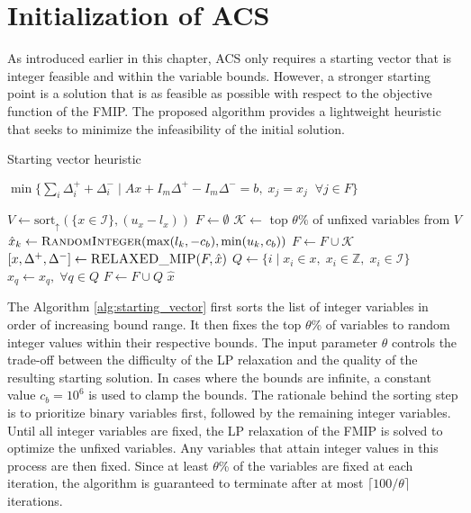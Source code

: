 \section{Initialization of ACS}
As introduced earlier in this chapter, ACS only requires a starting vector that is integer feasible and within the variable bounds. However, a stronger starting point is a solution that is as feasible as possible with respect to the objective function of the FMIP.
The proposed algorithm provides a lightweight heuristic that seeks to minimize the infeasibility of the initial solution.
\begin{algorithm}
\caption{Starting vector heuristic}\label{alg:starting_vector}
\begin{algorithmic}
    \State \Return $\min\{\sum_i \Delta_i^+ + \Delta_i^- \mid A x + I_m \Delta^+ - I_m \Delta^- = b, \; x_j = \hat{x}_j \;\; \forall j \in F\}$
\EndFunction
\end{algorithmic}
\vspace{1em}
\begin{algorithmic}[1]
\State $V \gets \text{sort}_\uparrow(\{x \in \mathcal{I}\}, (u_x-l_x))$
\State $F \gets \emptyset$
    \State $\mathcal{K} \gets$ top $\theta \%$ of unfixed variables from $V$
        \State $\hat{x}_k \gets \Call{RandomInteger}{\max(l_k, -c_b), \min(u_k, c_b)}$
    \EndFor
    \State $F \gets F \cup \mathcal{K}$
    \State $[x, \Delta^+, \Delta^-] \gets \Call{RELAXED\_MIP}{F,\hat{x}}$
    \State $Q \gets \{i \;|\; x_i \in x,\; x_i \in \mathbb{Z},\; x_i \in \mathcal{I}\}$
    \State $\hat{x}_q \gets x_q, \; \forall q \in Q$
    \State $F \gets F \cup Q$
\EndWhile
\State \Return $\hat{x}$
\EndFunction
\end{algorithmic}
\end{algorithm}
The Algorithm \ref{alg:starting_vector} first sorts the list of integer variables in order of increasing bound range. It then fixes the top $\theta$\% of variables to random integer values within their respective bounds. The input parameter $\theta$ controls the trade-off between the difficulty of the LP relaxation and the quality of the resulting starting solution. In cases where the bounds are infinite, a constant value $c_b = 10^6$ is used to clamp the bounds.
The rationale behind the sorting step is to prioritize binary variables first, followed by the remaining integer variables.
Until all integer variables are fixed, the LP relaxation of the FMIP is solved to optimize the unfixed variables. Any variables that attain integer values in this process are then fixed.
Since at least $\theta$\% of the variables are fixed at each iteration, the algorithm is guaranteed to terminate after at most $\lceil 100 / \theta \rceil$ iterations.
